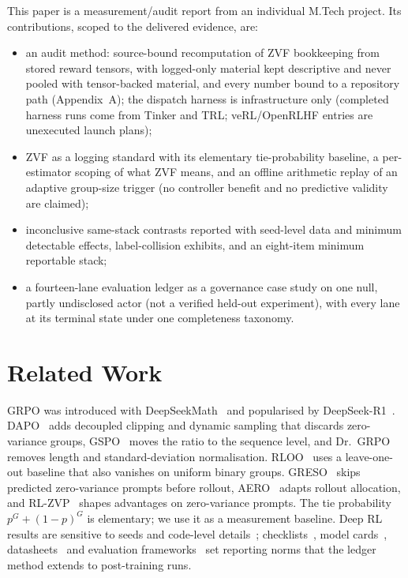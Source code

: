 \documentclass[conference]{IEEEtran}
\begin{document}
This paper is a measurement/audit report from an individual M.Tech
project. Its contributions, scoped to the delivered evidence, are:
\begin{itemize}
\item an audit method: source-bound recomputation of ZVF bookkeeping from
stored reward tensors, with logged-only material kept descriptive and never
pooled with tensor-backed material, and every number bound to a repository
path (Appendix~A); the dispatch harness is infrastructure only (completed
harness runs come from Tinker and TRL; veRL/OpenRLHF entries are unexecuted
launch plans);
\item ZVF as a logging standard with its elementary tie-probability
baseline, a per-estimator scoping of what ZVF means, and an offline
arithmetic replay of an adaptive group-size trigger (no controller benefit
and no predictive validity are claimed);
\item inconclusive same-stack contrasts reported with seed-level data and
minimum detectable effects, label-collision exhibits, and an eight-item
minimum reportable stack;
\item a fourteen-lane evaluation ledger as a governance case study on one
null, partly undisclosed actor (not a verified held-out experiment), with
every lane at its terminal state under one completeness taxonomy.
\end{itemize}

\section{Related Work}

GRPO was introduced with DeepSeekMath~\cite{shao2024deepseekmath} and
popularised by DeepSeek-R1~\cite{guo2025deepseekr1}. DAPO~\cite{yu2025dapo}
adds decoupled clipping and dynamic sampling that discards zero-variance
groups, GSPO~\cite{qwen2025gspo} moves the ratio to the sequence level, and
Dr.\ GRPO~\cite{liu2025understanding} removes length and standard-deviation
normalisation. RLOO~\cite{ahmadian2024backtobasics} uses a leave-one-out
baseline that also vanishes on uniform binary groups. GRESO~\cite{zheng2025greso}
skips predicted zero-variance prompts before rollout, AERO~\cite{zhang2026aero}
adapts rollout allocation, and RL-ZVP~\cite{le2025rlzvp} shapes advantages on
zero-variance prompts. The tie probability $p^G+(1-p)^G$ is elementary; we use
it as a measurement baseline. Deep RL results are
sensitive to seeds and code-level
details~\cite{henderson2018deep,engstrom2020implementation};
checklists~\cite{pineau2020improving}, model cards~\cite{mitchell2019modelcards},
datasheets~\cite{gebru2021datasheets} and evaluation
frameworks~\cite{liang2022helm,biderman2024lmeval} set reporting norms that the
ledger method extends to post-training runs.
\end{document}
